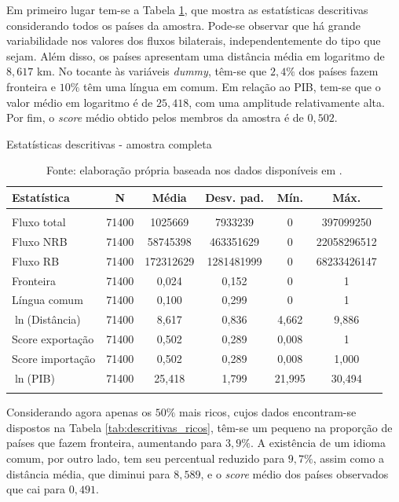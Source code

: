 \documentclass[12pt,
               openright,
               oneside,
               a4paper,
							 section=TITLE,     %
               subsection=Title,  %
               english,brazil]{article}
\begin{document}
Em primeiro lugar tem-se a Tabela \ref{tab:descritivas_total}, que mostra as estatísticas descritivas considerando todos os países da amostra. Pode-se observar que há grande variabilidade nos valores dos fluxos bilaterais, independentemente do tipo que sejam. Além disso, os países apresentam uma distância média em logaritmo de $8,617$ km. No tocante às variáveis \textit{dummy}, têm-se que $2,4\%$ dos países fazem fronteira e $10\%$ têm uma língua em comum. Em relação ao PIB, tem-se que o valor médio em logaritmo é de $25,418$, com uma amplitude relativamente alta. Por fim, o \textit{score} médio obtido pelos membros da amostra é de $0,502$.

\begin{table}[H] 
	\centering 
	\caption{Estatísticas descritivas - amostra completa} 
	\label{tab:descritivas_total} 
	\begin{tabular}{@{\extracolsep{5pt}}lccccc} 
		\\[-1.8ex]\toprule 
		Estatística & \multicolumn{1}{c}{N} & \multicolumn{1}{c}{Média} & \multicolumn{1}{c}{Desv. pad.} & \multicolumn{1}{c}{Mín.} &  \multicolumn{1}{c}{Máx.} \\ 
		\midrule \\[-1.8ex] 
		Fluxo total & 71400 & 1025669 & 7933239 & 0 & 397099250 \\ 
		Fluxo NRB & 71400 & 58745398 & 463351629 & 0 &  22058296512 \\ 
		Fluxo RB & 71400 & 172312629 & 1281481999 & 0 &  68233426147 \\ 
		Fronteira & 71400 & 0,024 & 0,152 & 0 & 1 \\ 
		Língua comum & 71400 & 0,100 & 0,299 & 0 & 1 \\ 
		$\ln$(Distância) & 71400 & 8,617 & 0,836 & 4,662 & 9,886 \\ 
		Score exportação & 71400 & 0,502 & 0,289 & 0,008 &  1 \\ 
		Score importação & 71400 & 0,502 & 0,289 & 0,008 &  1,000 \\
		$\ln$(PIB) & 71400 & 25,418 & 1,799 & 21,995 & 30,494 \\ \bottomrule \\[-1.8ex] 
	\end{tabular}
\caption*{\RaggedRight  Fonte: elaboração própria baseada nos dados disponíveis em \cite{Cepii2019, Comtrade2019, WorldBank2019}.}
\end{table} 
Considerando agora apenas os $50\%$ mais ricos, cujos dados encontram-se dispostos na Tabela \ref{tab:descritivas_ricos}, têm-se um pequeno na proporção de países que fazem fronteira, aumentando para $3,9\%$. A existência de um idioma comum, por outro lado, tem seu percentual reduzido para $9,7\%$, assim como a distância média, que diminui para $8,589$, e o \textit{score} médio dos países observados que cai para $0,491$. 
\end{document}
